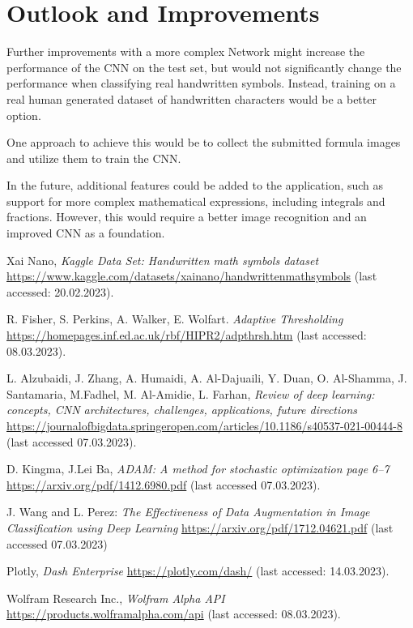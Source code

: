 \documentclass[@CLASSOPTIONS@]{tumarticle}
\begin{document}
\section{Outlook and Improvements}

Further improvements with a more complex Network might increase the performance of the CNN on the test set,
but would not significantly change the performance when classifying real handwritten symbols.
Instead, training on a real human generated dataset of handwritten characters would be a better option.

One approach to achieve this would be to collect the submitted formula images and utilize them to train the CNN\@.

In the future, additional features could be added to the application,
such as support for more complex mathematical expressions, including integrals and fractions.
However, this would require a better image recognition and an improved CNN as a foundation.

\begin{thebibliography}{7}

  Xai Nano,
  \emph{Kaggle Data Set: Handwritten math symbols dataset}
  \url{https://www.kaggle.com/datasets/xainano/handwrittenmathsymbols}
  (last accessed: 20.02.2023).

  R. Fisher, S. Perkins, A. Walker, E. Wolfart.
  \emph{Adaptive Thresholding}
  \url{https://homepages.inf.ed.ac.uk/rbf/HIPR2/adpthrsh.htm}
  (last accessed: 08.03.2023).

  L. Alzubaidi, J. Zhang, A. Humaidi, A. Al-Dajuaili, Y. Duan, O. Al-Shamma, J. Santamaria, M.Fadhel, M. Al-Amidie, L. Farhan,
  \emph{Review of deep learning: concepts, CNN architectures, challenges, applications, future directions}
  \url{https://journalofbigdata.springeropen.com/articles/10.1186/s40537-021-00444-8}
  (last accessed 07.03.2023).

  D. Kingma, J.Lei Ba, \emph{ADAM: A method for stochastic optimization page 6--7}
  \url{https://arxiv.org/pdf/1412.6980.pdf}
  (last accessed 07.03.2023).

  J. Wang and L. Perez: \emph{The Effectiveness of Data Augmentation in Image Classification using Deep Learning}
  \url{https://arxiv.org/pdf/1712.04621.pdf}
  (last accessed 07.03.2023)

  Plotly,
  \emph{Dash Enterprise}
  \url{https://plotly.com/dash/}
  (last accessed: 14.03.2023).

  Wolfram Research Inc.,
  \emph{Wolfram Alpha API}
  \url{https://products.wolframalpha.com/api}
  (last accessed: 08.03.2023).



\end{thebibliography}
\end{document}
